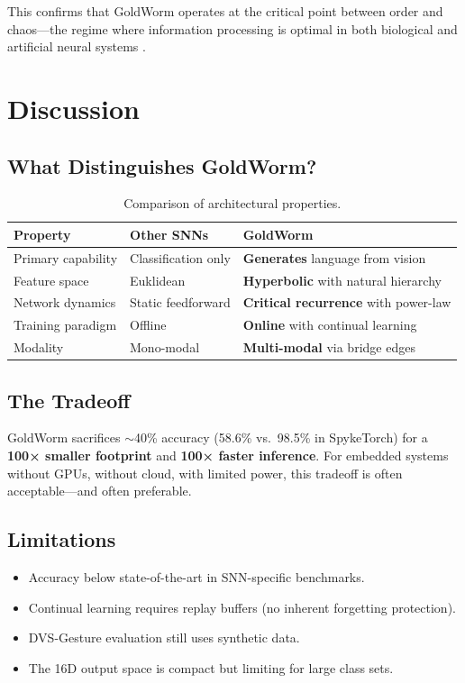 \documentclass[conference]{IEEEtran}
\begin{document}
This confirms that GoldWorm operates at the critical point between order and chaos---the regime where information processing is optimal in both biological and artificial neural systems \cite{criticality_brain}.

\section{Discussion}

\subsection{What Distinguishes GoldWorm?}

\begin{table}[h]
\centering
\caption{Comparison of architectural properties.}
\label{tab:comparison}
\begin{tabular}{lll}
\toprule
\textbf{Property} & \textbf{Other SNNs} & \textbf{GoldWorm} \\
\midrule
Primary capability & Classification only & \textbf{Generates} language from vision \\
Feature space & Euklidean & \textbf{Hyperbolic} with natural hierarchy \\
Network dynamics & Static feedforward & \textbf{Critical recurrence} with power-law \\
Training paradigm & Offline & \textbf{Online} with continual learning \\
Modality & Mono-modal & \textbf{Multi-modal} via bridge edges \\
\bottomrule
\end{tabular}
\end{table}

\subsection{The Tradeoff}
GoldWorm sacrifices $\sim$40\% accuracy (58.6\% vs.\ 98.5\% in SpykeTorch) for a \textbf{100× smaller footprint} and \textbf{100× faster inference}. For embedded systems without GPUs, without cloud, with limited power, this tradeoff is often acceptable---and often preferable.

\subsection{Limitations}
\begin{itemize}
    \item Accuracy below state-of-the-art in SNN-specific benchmarks.
    \item Continual learning requires replay buffers (no inherent forgetting protection).
    \item DVS-Gesture evaluation still uses synthetic data.
    \item The 16D output space is compact but limiting for large class sets.
\end{itemize}
\end{document}

